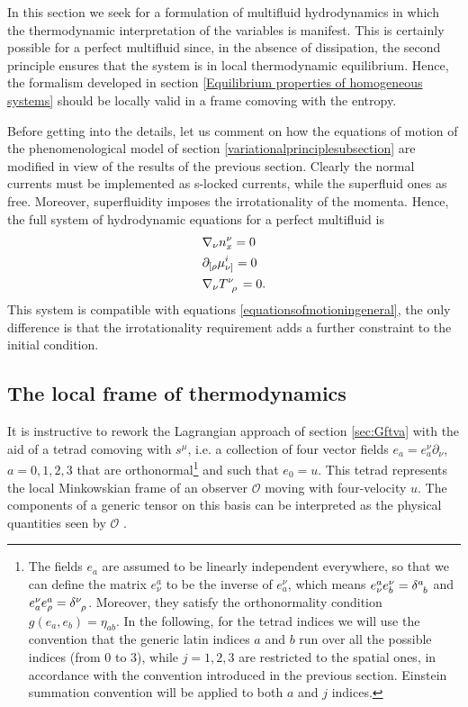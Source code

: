 \documentclass[usenatbib]{mnras}
\begin{document}
In this section we seek for a formulation of multifluid hydrodynamics in which the  thermodynamic interpretation of the variables is manifest. This is certainly possible for a perfect multifluid since, in the absence of dissipation, the second principle ensures that the system is in local thermodynamic equilibrium. Hence, the  formalism developed in section \ref{Equilibrium properties of homogeneous systems} should be locally valid in a frame comoving with the entropy.

Before getting into the details, let us comment on how the equations of motion of the phenomenological model of section \eqref{variationalprinciplesubsection} are modified in view of the results of the previous section.  Clearly the  normal currents must be implemented as s-locked currents, while the superfluid ones  as free. Moreover, superfluidity imposes the irrotationality of the momenta. Hence, the full system of hydrodynamic equations for a perfect multifluid is
%
\begin{equation}\label{dynamicsss}
\begin{split}
& \nabla_\nu n_x^\nu=0 \\
& \partial_{[\rho} \mu^i_{\nu]}=0 \\
& \nabla_\nu T\indices{^\nu _\rho}=0. \\
\end{split}
\end{equation} 
%
This system is compatible with  equations \eqref{equationsofmotioningeneral}, the only difference is that the irrotationality requirement adds a further constraint to the initial condition.


\subsection{The local frame of thermodynamics}
\label{The local frame of thermodynamics}


It is instructive to rework the Lagrangian approach of section \ref{sec:Gftva}  with the aid of a tetrad comoving with $s^\mu$, i.e. a collection of four vector fields $e_a=e^\nu _a \partial_\nu$, $a=0,1,2,3$ that are orthonormal\footnote{
The fields $e_a$ are assumed to be linearly independent everywhere, so that we can define the matrix $e^a_\nu$ to be the inverse of $e_a^\nu$, which means $e^a_\nu e^\nu_b = \delta\indices{^a _b}$ and $e^\nu_a e^a_\rho = \delta\indices{^\nu _\rho}$. Moreover, they satisfy the orthonormality condition 
$g(e_a,e_b) = \eta_{ab}$. In the following, for the tetrad indices we will use the convention that the generic latin indices $a$ and $b$ run over all the possible indices (from $0$ to $3$), while $j=1,2,3$ are restricted to the spatial ones, in accordance with the convention introduced in the previous section. Einstein summation convention will be applied to both $a$ and $j$ indices.
}
and such that $e_0 = u$. This tetrad represents the local Minkowskian frame of an observer $\mathcal{O}$ moving with four-velocity $u$. The components of a generic tensor on this basis can be interpreted as the physical quantities seen by $\mathcal{O}$ \citep[see e.g. ][]{special_in_gen}. 
\end{document}
